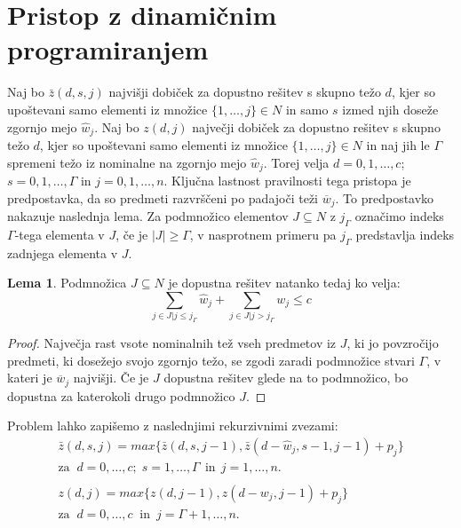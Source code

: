 \documentclass[a4paper,12pt]{article}
\theoremstyle{definition}
\newtheorem{definition}{Lema}
\begin{document}
\section{Pristop z dinamičnim programiranjem}   %
\medskip
Naj bo $ \bar{z}(d, s, j) $ najvišji dobiček za dopustno rešitev s skupno težo $d$, kjer so upoštevani 
samo elementi iz množice $\{1, \dots,j\} \in N$ in samo $s$ izmed njih doseže zgornjo mejo $\hat{w}_j$. 
Naj bo $z(d, j)$ največji dobiček za dopustno rešitev s skupno težo $d$, kjer so upoštevani samo elementi 
iz množice $\{ 1,\dots,j \} \in N $ in naj jih le $\Gamma $ spremeni težo iz nominalne na zgornjo mejo $\hat{w}_j$. 
Torej velja $d = 0, 1, \dots, c$; $s = 0, 1, \dots, \Gamma$ in $ j = 0, 1, \dots, n$.
Ključna lastnost pravilnosti tega pristopa je predpostavka, da so predmeti razvrščeni po padajoči teži $\overline{w}_j$. 
To predpostavko nakazuje naslednja lema. Za podmnožico elementov
 $J \subseteq N$ z $j_\Gamma$ označimo indeks $\Gamma$-tega elementa v $J$, če
 je $|J| \geq \Gamma$, v nasprotnem primeru pa $j_\Gamma$ predstavlja indeks 
 zadnjega elementa v $J$. 
\begin{definition}\label{lema1}
Podmnožica $J \subseteq N$ je dopustna rešitev natanko tedaj ko velja:
\begin{equation}
    \tag*{}
        \sum_{j \in J|j \leq j_\Gamma} \hat{w}_j + \sum_{j \in J|j > j_\Gamma}w_j \leq c
\end{equation}
\end{definition}
\begin{proof}
    Največja rast vsote nominalnih tež vseh predmetov iz $J$, ki jo
    povzročijo predmeti, ki dosežejo svojo zgornjo težo, se zgodi zaradi 
    podmnožice stvari $\Gamma$, v kateri je $\overline{w}_j$ najvišji. Če je
    $J$ dopustna rešitev glede na to podmnožico, bo dopustna za katerokoli drugo
    podmnožico $J$.
\end{proof}
Problem lahko zapišemo z naslednjimi rekurzivnimi zvezami: 
\begin{equation}  
    \tag*{}
    \begin{matrix}
    \bar{z}(d, s, j) = max\{ \bar{z}(d, s, j - 1), \bar{z}(d - \hat{w}_j, s- 1, j - 1) + p_j\} \\
    \text{za} \; \; d = 0,\dots, c; \; s = 1,\dots, \Gamma \:\: \text{in} \:\:j = 1,\dots, n. \\ 
    \\
    z(d, j) = max\{z(d, j - 1), z (d - w_j, j - 1) + p_j\} \\
    \text{za} \; \; d = 0,\dots, c\;\;\text{in}\;\: j = \Gamma + 1,\dots, n.
    \end{matrix}
\end{equation} 
\end{document}
